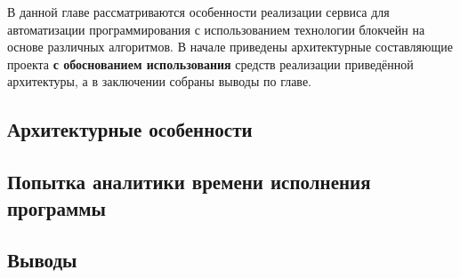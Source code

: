 В данной главе рассматриваются особенности реализации сервиса для
автоматизации программирования с использованием технологии блокчейн на основе
различных алгоритмов. В начале приведены архитектурные составляющие проекта
\textbf{с обоснованием использования} средств реализации приведённой
архитектуры, а в заключении собраны выводы по главе.

\subsection{Архитектурные особенности}


\subsection{Попытка аналитики времени исполнения программы}


\subsection{Выводы}

